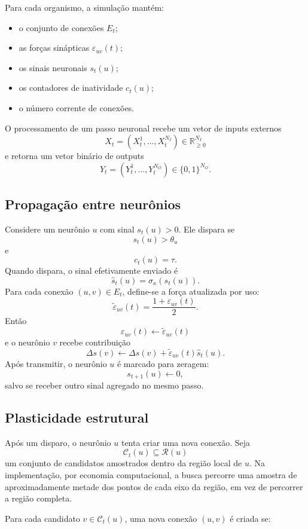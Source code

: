 \documentclass[12pt,a4paper,fleqn]{article}
\newcommand{\R}{\mathbb{R}}
\begin{document}
Para cada organismo, a simulação mantém:

\begin{itemize}
	\item o conjunto de conexões $E_t$;
	\item as forças sinápticas $\varepsilon_{uv}(t)$;
	\item os sinais neuronais $s_t(u)$;
	\item os contadores de inatividade $c_t(u)$;
	\item o número corrente de conexões.
\end{itemize}

O processamento de um passo neuronal recebe um vetor de inputs externos
$$
	X_t=(X_t^1,\ldots,X_t^{N_I})\in\R_{\geq 0}^{N_I}
$$
e retorna um vetor binário de outputs
$$
	Y_t=(Y_t^1,\ldots,Y_t^{N_O})\in\{0,1\}^{N_O}.
$$

\subsection{Propagação entre neurônios}

Considere um neurônio $u$ com sinal $s_t(u)>0$. Ele dispara se
$$
	s_t(u)>\theta_u
$$
e
$$
	c_t(u)=\tau.
$$
Quando dispara, o sinal efetivamente enviado é
$$
	\widehat{s}_t(u)=\sigma_\kappa(s_t(u)).
$$
Para cada conexão $(u,v)\in E_t$, define-se a força atualizada por uso:
$$
	\widetilde{\varepsilon}_{uv}(t)=\frac{1+\varepsilon_{uv}(t)}{2}.
$$
Então
$$
	\varepsilon_{uv}(t)\leftarrow \widetilde{\varepsilon}_{uv}(t)
$$
e o neurônio $v$ recebe contribuição
$$
	\Delta s(v) \leftarrow \Delta s(v)+\widetilde{\varepsilon}_{uv}(t)\widehat{s}_t(u).
$$
Após transmitir, o neurônio $u$ é marcado para zeragem:
$$
	s_{t+1}(u)\leftarrow 0,
$$
salvo se receber outro sinal agregado no mesmo passo.

\subsection{Plasticidade estrutural}

Após um disparo, o neurônio $u$ tenta criar uma nova conexão. Seja
$$
	\mathcal{C}_t(u)\subseteq\mathcal{R}(u)
$$
um conjunto de candidatos amostrados dentro da região local de $u$. Na implementação, por economia computacional, a busca percorre uma amostra de aproximadamente metade dos pontos de cada eixo da região, em vez de percorrer a região completa.

Para cada candidato $v\in\mathcal{C}_t(u)$, uma nova conexão $(u,v)$ é criada se:
\end{document}
